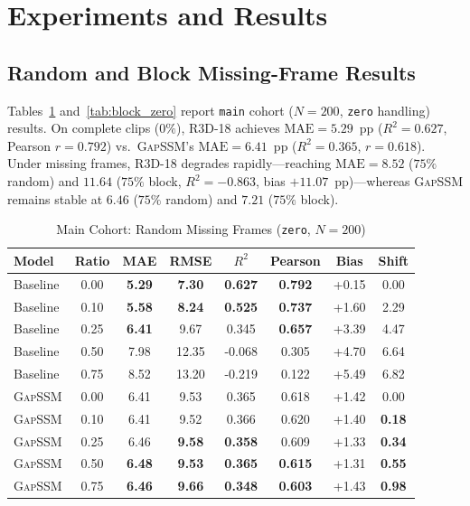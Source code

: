 \documentclass[conference]{IEEEtran}
\begin{document}
\section{Experiments and Results}

\subsection{Random and Block Missing-Frame Results}
Tables~\ref{tab:random_zero} and~\ref{tab:block_zero} report \texttt{main} cohort ($N=200$, \texttt{zero} handling) results. On complete clips ($0\%$), R3D-18 achieves $\text{MAE}=5.29$~pp ($R^2=0.627$, Pearson $r=0.792$) vs.\ \textsc{GapSSM}'s $\text{MAE}=6.41$~pp ($R^2=0.365$, $r=0.618$). Under missing frames, R3D-18 degrades rapidly—reaching $\text{MAE}=8.52$ ($75\%$ random) and $11.64$ ($75\%$ block, $R^2=-0.863$, bias $+11.07$~pp)—whereas \textsc{GapSSM} remains stable at $6.46$ ($75\%$ random) and $7.21$ ($75\%$ block).

\begin{table}[t]
\centering
\caption{Main Cohort: Random Missing Frames (\texttt{zero}, $N=200$)}
\label{tab:random_zero}
\setlength{\tabcolsep}{3pt}
\begin{tabular}{lccccccc}
\toprule
Model & Ratio & MAE & RMSE & $R^2$ & Pearson & Bias & Shift \\
\midrule
Baseline & 0.00 & \textbf{5.29} & \textbf{7.30} & \textbf{0.627} & \textbf{0.792} & +0.15 & 0.00 \\
Baseline & 0.10 & \textbf{5.58} & \textbf{8.24} & \textbf{0.525} & \textbf{0.737} & +1.60 & 2.29 \\
Baseline & 0.25 & \textbf{6.41} & 9.67 & 0.345 & \textbf{0.657} & +3.39 & 4.47 \\
Baseline & 0.50 & 7.98 & 12.35 & -0.068 & 0.305 & +4.70 & 6.64 \\
Baseline & 0.75 & 8.52 & 13.20 & -0.219 & 0.122 & +5.49 & 6.82 \\
\midrule
\textsc{GapSSM} & 0.00 & 6.41 & 9.53 & 0.365 & 0.618 & +1.42 & 0.00 \\
\textsc{GapSSM} & 0.10 & 6.41 & 9.52 & 0.366 & 0.620 & +1.40 & \textbf{0.18} \\
\textsc{GapSSM} & 0.25 & 6.46 & \textbf{9.58} & \textbf{0.358} & 0.609 & +1.33 & \textbf{0.34} \\
\textsc{GapSSM} & 0.50 & \textbf{6.48} & \textbf{9.53} & \textbf{0.365} & \textbf{0.615} & +1.31 & \textbf{0.55} \\
\textsc{GapSSM} & 0.75 & \textbf{6.46} & \textbf{9.66} & \textbf{0.348} & \textbf{0.603} & +1.43 & \textbf{0.98} \\
\bottomrule
\end{tabular}
\end{table}
\end{document}
